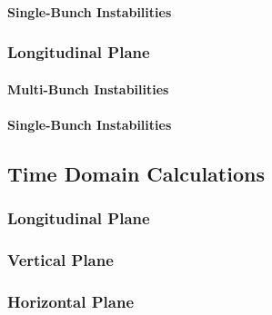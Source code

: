 \documentclass[
	12pt,				%
	openright,			%
	oneside,			%
	a4paper,		%
	chapter=TITLE,		%
	section=TITLE,		%
    brazil,				%
	english,			%
	sumario=tradicional,
	]{abntex2}
\begin{document}
        \paragraph{Single-Bunch Instabilities}
      \subsubsection{Longitudinal Plane}
        \paragraph{Multi-Bunch Instabilities}
        \paragraph{Single-Bunch Instabilities}
    \subsection{Time Domain Calculations}
      \subsubsection{Longitudinal Plane}
      \subsubsection{Vertical Plane}
      \subsubsection{Horizontal Plane}


    
    
	
    




	\postextual
	
\end{document}

